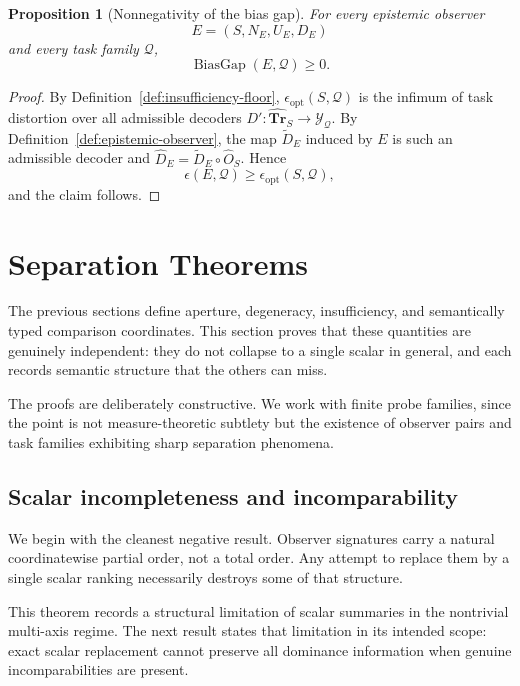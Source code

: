 \documentclass[11pt,twoside]{article}
\newtheorem{proposition}[theorem]{Proposition}
\theoremstyle{definition}
\newcommand{\Tr}{\mathbf{Tr}}
\DeclareMathOperator{\BiasGap}{BiasGap}
\begin{document}
\begin{proposition}[Nonnegativity of the bias gap]
\label{prop:bias-gap-nonnegative}
For every epistemic observer
\[
  E=(S,N_E,U_E,D_E)
\]
and every task family \(\mathcal{Q}\),
\[
  \BiasGap(E,\mathcal{Q}) \ge 0.
\]
\end{proposition}

\begin{proof}
By Definition~\ref{def:insufficiency-floor}, \(\epsilon_{\mathrm{opt}}(S,\mathcal{Q})\) is the infimum of task distortion over all admissible decoders \(D':\widehat{\Tr}_S\to\mathcal{Y}_{\mathcal{Q}}\). By Definition~\ref{def:epistemic-observer}, the map \(\widetilde{D}_E\) induced by \(E\) is such an admissible decoder and \(\widehat{D}_E=\widetilde{D}_E\circ\widehat{O}_S\). Hence
\[
  \epsilon(E,\mathcal{Q}) \ge \epsilon_{\mathrm{opt}}(S,\mathcal{Q}),
\]
and the claim follows.
\end{proof}

\section{Separation Theorems}
\label{sec:separation}

The previous sections define aperture, degeneracy, insufficiency, and semantically typed comparison coordinates. This section proves that these quantities are genuinely independent: they do not collapse to a single scalar in general, and each records semantic structure that the others can miss.

The proofs are deliberately constructive. We work with finite probe families, since the point is not measure-theoretic subtlety but the existence of observer pairs and task families exhibiting sharp separation phenomena.

\subsection{Scalar incompleteness and incomparability}
\label{subsec:scalar-incompleteness}

We begin with the cleanest negative result. Observer signatures carry a natural coordinatewise partial order, not a total order. Any attempt to replace them by a single scalar ranking necessarily destroys some of that structure.

This theorem records a structural limitation of scalar summaries in the nontrivial multi-axis regime. The next result states that limitation in its intended scope: exact scalar replacement cannot preserve all dominance information when genuine incomparabilities are present.
\end{document}
